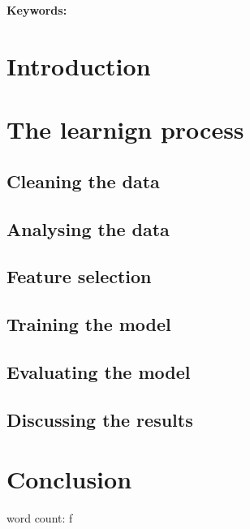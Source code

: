 \documentclass[british]{article}
\title{}
\author{170008773}
\date{\today}
\begin{document}
\maketitle


\begin{abstract}
 
\end{abstract}
{\bf Keywords:} 



\section{Introduction}
\label{intro}
\cite{}
 
\section{The learnign process}
\subsection{Cleaning the data}
\subsection{Analysing the data}
\subsection{Feature selection}
\subsection{Training the model}
\subsection{Evaluating the model}
\subsection{Discussing the results}


\section{Conclusion}
\label{conclusion}

 
 
 
word count: 
\printbibliography
f
\end{document}
